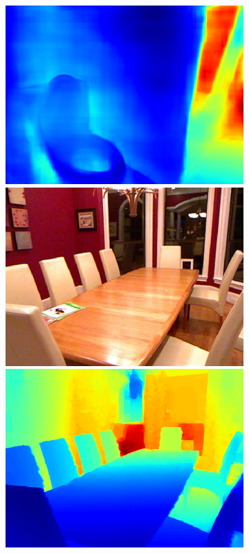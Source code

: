 \begin{figure}[htb]
\begin{subfigure}{0.15\linewidth}
\begin{minipage}[t]{1\linewidth}
  \includegraphics[width=1\linewidth]{figure/nyu_without/bathroom_rgb_00706.png}
  \includegraphics[width=1\linewidth]{figure/nyu_rgb/1399.png}
  \includegraphics[width=1\linewidth]{figure/nyu_gt/1399.png}

\end{minipage}
\end{subfigure}
\end{figure}
